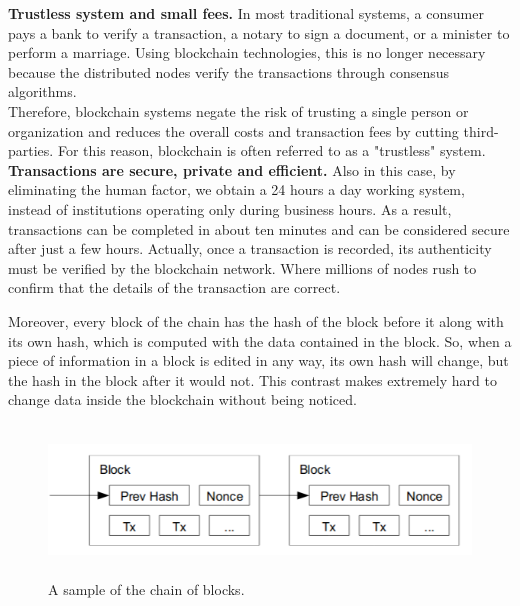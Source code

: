 \textbf{Trustless system and small fees.}
In most traditional systems, a consumer pays a bank to verify a transaction,   
a notary to sign a document, or a minister to perform a marriage. Using 
blockchain technologies, this is no longer necessary because the distributed
nodes verify the transactions through consensus algorithms.\\
Therefore, blockchain systems negate the risk of trusting a single person or 
organization and reduces the overall costs and transaction fees by cutting 
third-parties. For this reason, blockchain is often referred to as a "trustless"
system.\cite{binancevision}\cite{investopedia}
\bigskip\\
\textbf{Transactions are secure, private and efficient.}
Also in this case, by eliminating the human factor, we obtain a 24 hours a day 
working system, instead of institutions operating only during business hours.
As a result, transactions can be completed in about ten minutes and can be 
considered secure after just a few hours. Actually, once a transaction is 
recorded, its authenticity must be verified by the blockchain network. Where 
millions of nodes rush to confirm that the details of the transaction are correct.

Moreover, every block of the chain has the hash of the block before it along with
its own hash, which is computed with the data contained in the block. So, when
a piece of information in a block is edited in any way, its own hash will change, but the
hash in the block after it would not. This contrast makes extremely hard to 
change data inside the blockchain without being noticed.

\begin{figure}[h]
    \centering
    \includegraphics[height=4cm]{block_hash.png}
    \caption{A sample of the chain of blocks.\cite{bitcoin}}
    \label{fig:blockhash}
\end{figure}

